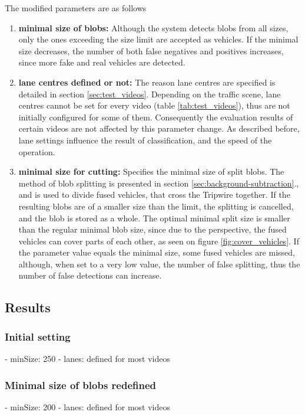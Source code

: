 The modified parameters are as follows
\begin{enumerate}
	\item \textbf{minimal size of blobs:} Although the system detects blobs from all sizes, only the ones exceeding the size limit are accepted as vehicles. If the minimal size decreases, the number of both false negatives and positives increases, since more fake and real vehicles are detected.
	
	\item \textbf{lane centres defined or not:} The reason lane centres are specified is detailed in section \ref{sec:test_videos}. Depending on the traffic scene, lane centres cannot be set for every video (table \ref{tab:test_videos}), thus are not initially configured for some of them. Consequently the evaluation results of certain videos are not affected by this parameter change. As described before, lane settings influence the result of classification, and the speed of the operation.
	
	\item \textbf{minimal size for cutting:} Specifies the minimal size of split blobs. The method of blob splitting is presented in section \ref{sec:background-subtraction}., and is used to divide fused vehicles, that cross the Tripwire together. If the resulting blobs are of a smaller size than the limit, the splitting is cancelled, and the blob is stored as a whole. The optimal minimal split size is smaller than the regular minimal blob size, since due to the perspective, the fused vehicles can cover parts of each other, as seen on figure \ref{fig:cover_vehicles}. If the parameter value equals the minimal size, some fused vehicles are missed, although, when set to a very low value, the number of false splitting, thus the number of false detections can increase.
\end{enumerate}

\subsection{Results}

\subsubsection{Initial setting}
- minSize: 250
- lanes: defined for most videos

\subsubsection{Minimal size of blobs redefined}
- minSize: 200
- lanes: defined for most videos

